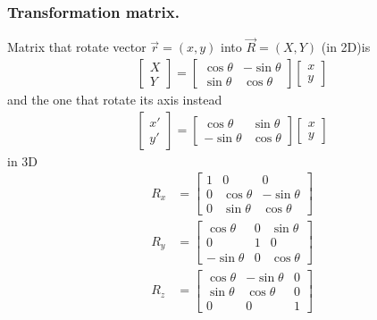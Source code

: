 \documentclass[../../../main.tex]{subfiles}
\begin{document}
\subsubsection{Transformation matrix.} Matrix that rotate vector $\vec{r}=(x,y)$ into $\vec{R}=(X,Y)$ (in 2D)is
\begin{align*}
	\begin{bmatrix}
		X \\Y
	\end{bmatrix}=
	\begin{bmatrix}
		\cos \theta & -\sin \theta \\
		\sin \theta & \cos \theta
	\end{bmatrix}
	\begin{bmatrix}
		x \\y
	\end{bmatrix}
\end{align*}
and the one that rotate its axis instead
\begin{align*}
	\begin{bmatrix}
		x' \\y'
	\end{bmatrix}=
	\begin{bmatrix}
		\cos \theta  & \sin \theta \\
		-\sin \theta & \cos \theta
	\end{bmatrix}
	\begin{bmatrix}
		x \\y
	\end{bmatrix}
\end{align*}
in 3D
\begin{align*}
	R_x & =\begin{bmatrix}
		       1 & 0          & 0           \\
		       0 & \cos\theta & -\sin\theta \\
		       0 & \sin\theta & \cos\theta
	       \end{bmatrix}   \\
	R_y & =\begin{bmatrix}
		       \cos\theta  & 0 & \sin\theta \\
		       0           & 1 & 0          \\
		       -\sin\theta & 0 & \cos\theta
	       \end{bmatrix}   \\
	R_z & =\begin{bmatrix}
		       \cos \theta & -\sin \theta & 0 \\
		       \sin \theta & \cos \theta  & 0 \\
		       0           & 0            & 1
	       \end{bmatrix}
\end{align*}
\end{document}
